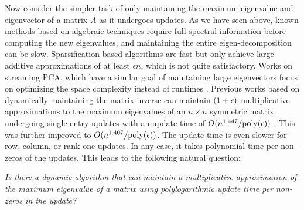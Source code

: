 \documentclass[11pt]{article}
\newcommand\poly{\mathrm{poly}}  \newcommand{\comp}[1]{\overline{#1}}
\renewcommand\AA{\boldsymbol{\mathit{A}}}
\begin{document}
Now consider the simpler task of only maintaining the maximum eigenvalue and eigenvector of a matrix $\AA$ as it undergoes updates. As we have seen above, known methods based on algebraic techniques require full spectral information before computing the new eigenvalues, and maintaining the entire eigen-decomposition can be slow. Sparsification-based algorithms are fast but only achieve large additive approximations of at least $\epsilon n$, which is not quite satisfactory. Works on streaming PCA, which have a similar goal of maintaining large eigenvectors focus on optimizing the space complexity instead of runtimes \cite{allen2017first}.
Previous works based on dynamically maintaining the matrix inverse can maintain $(1+\epsilon)$-multiplicative approximations to the maximum eigenvalues of an $n \times n$ symmetric matrix undergoing single-entry updates with an update time of $O(n^{1.447}/\poly(\eps))$ \cite{sankowski2004dynamic}. This was further improved to $O(n^{1.407}/\poly(\eps))$\cite{van2019dynamic}. The update time is even slower for row, column, or rank-one updates. In any case, it takes polynomial time per non-zeros of the updates. This leads to the following natural question:

\begin{center}
    \emph{Is there a dynamic algorithm that can maintain a multiplicative approximation of the maximum eigenvalue of a matrix using polylogarithmic update time per non-zeros in the update?}\par
\end{center}
\end{document}

